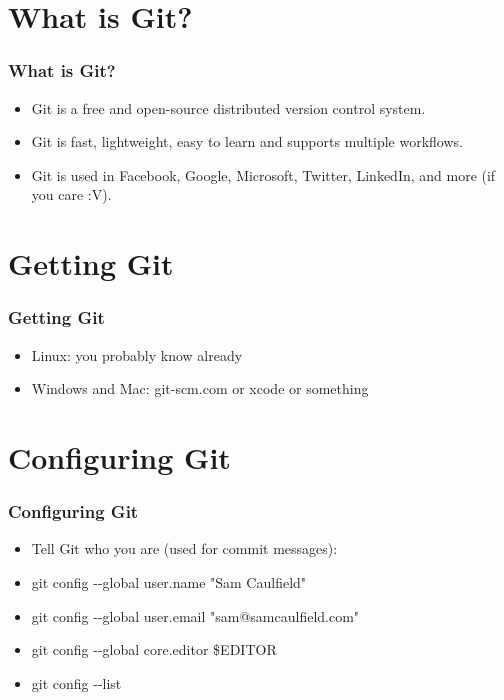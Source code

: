 \documentclass{beamer}
\begin{document}
\section{What is Git?}
\begin{frame}
\frametitle{What is Git?}
\begin{itemize}
\pause
\item Git is a free and open-source distributed version control system.
\pause
\item Git is fast, lightweight, easy to learn and supports multiple workflows.
\pause
\item Git is used in Facebook, Google, Microsoft, Twitter, LinkedIn, and more
(if you care :V).
\end{itemize}
\end{frame}


\section{Getting Git}
\begin{frame}
\frametitle{Getting Git}
\begin{itemize}
\pause
\item Linux: you probably know already
\pause
\item Windows and Mac: git-scm.com or xcode or something
\end{itemize}
\end{frame}


\section{Configuring Git}
\begin{frame}
\frametitle{Configuring Git}
\begin{itemize}
\pause
\item Tell Git who you are (used for commit messages):
\pause
\item git config -{}-global user.name "Sam Caulfield"
\pause
\item git config -{}-global user.email "sam@samcaulfield.com"
\pause
\item git config -{}-global core.editor \$EDITOR
\pause
\item git config -{}-list
\end{itemize}
\end{frame}
\end{document}
